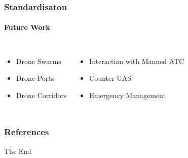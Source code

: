 \documentclass[usenames,dvipsnames,aspectratio=169,serif]{beamer}
\begin{document}

\begin{frame}[fragile] %
   \frametitle{Standardisaton}
   \framesubtitle{Future Work}
   \begin{columns}[t]
      \begin{itemize}
         \item Drone Swarms
         \item Drone Ports
         \item Drone Corridors
      \end{itemize}
      \begin{itemize}
         \item Interaction with Manned ATC
         \item Counter-UAS
         \item Emergency Management
      \end{itemize}
   \end{columns}
\end{frame}


\begin{frame}[t, allowframebreaks]
   \frametitle{References}
   {\footnotesize
   

   
   }
\end{frame}


\begin{frame}
   \Huge{\centerline{The End}}
\end{frame}

\end{document}
